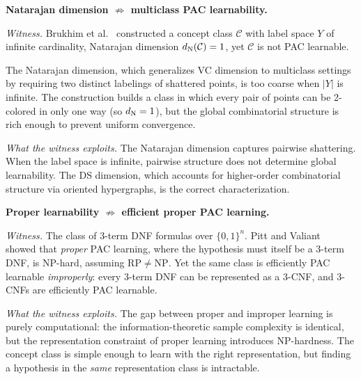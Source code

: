 
\begin{separation}
\textbf{Natarajan dimension $\not\Rightarrow$ multiclass PAC
learnability.}

\medskip\noindent
\emph{Witness.}
Brukhim et al.~\cite{BrukhimCarmonDinurMoranYehudayoff2022}
constructed a concept class $\mathcal{C}$ with label space
$Y$ of infinite cardinality, Natarajan dimension $d_{\mathrm{N}}(\mathcal{C})=1$,
yet $\mathcal{C}$ is not PAC learnable.

The Natarajan dimension, which
generalizes VC dimension to multiclass settings by requiring two
distinct labelings of shattered points, is too coarse when $|Y|$ is
infinite. The construction builds a class in which every pair of points
can be 2-colored in only one way (so $d_{\mathrm{N}} = 1$), but the global
combinatorial structure is rich enough to prevent uniform convergence.

\medskip\noindent
\emph{What the witness exploits.}
The Natarajan dimension captures pairwise shattering. When the label
space is infinite, pairwise structure does not determine global
learnability. The DS dimension, which accounts for higher-order
combinatorial structure via oriented hypergraphs, is the correct
characterization.

\hfill\cite{BrukhimCarmonDinurMoranYehudayoff2022}
\end{separation}


\begin{separation}
\textbf{Proper learnability $\not\Rightarrow$ efficient proper PAC
learning.}

\medskip\noindent
\emph{Witness.}
The class of 3-term DNF formulas over $\{0,1\}^n$. Pitt and
Valiant~\cite{PittValiant1988} showed that \emph{proper} PAC
learning, where the hypothesis must itself be a 3-term DNF, is
NP-hard, assuming $\mathrm{RP} \neq \mathrm{NP}$. Yet the same class
is efficiently PAC learnable \emph{improperly}: every 3-term DNF can be
represented as a 3-CNF, and 3-CNFs are efficiently PAC learnable.

\medskip\noindent
\emph{What the witness exploits.}
The gap between proper and improper learning is purely
computational: the information-theoretic sample complexity is
identical, but the representation constraint of proper learning
introduces NP-hardness. The concept class is simple enough to learn
with the right representation, but finding a hypothesis in the
\emph{same} representation class is intractable.

\hfill\cite{PittValiant1988}
\end{separation}

